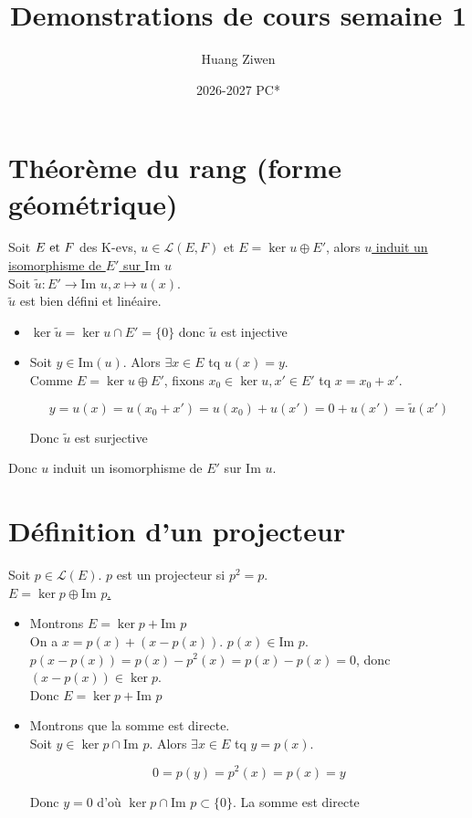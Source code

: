 \documentclass[]{article}
\title{Demonstrations de cours semaine 1}
\author{Huang Ziwen}
\date{2026-2027 PC*}
\begin{document}
\section{Théorème du rang (forme géométrique)}

Soit $E \text{ et } F$ des K-evs, $u \in \mathcal{L}(E, F)$ et $E = \ker u \oplus E'$, alors \underline{$u$ induit un isomorphisme de $E'$ sur $\text{Im } u$} \\

Soit $\tilde{u} : E' \rightarrow \text{Im } u, x \mapsto u(x)$. \\

$\tilde{u}$ est bien défini et linéaire. 

\begin{itemize}
    \item $\ker \tilde{u} = \ker u \cap E' = \{0\}$ donc $\tilde{u}$ est injective
    \item Soit $y \in \text{Im}(u)$. Alors $\exists x \in E$ tq $u(x) = y$. \\
    
    Comme $E = \ker u \oplus E'$, fixons $x_0 \in \ker u, x' \in E'$ tq $x = x_0 + x'$. 

    \[ y = u(x) = u(x_0 + x') = u(x_0) + u(x') = 0 + u(x') = \tilde{u}(x') \]

    Donc $\tilde{u}$ est surjective
\end{itemize}

Donc $u$ induit un isomorphisme de $E'$ sur $\text{Im } u$. 

\section{Définition d'un projecteur}

Soit $p \in \mathcal{L}(E)$. $p$ est un projecteur si \underline{$p^2 = p$}. \\

\underline{$E = \ker p \oplus \text{Im }p$.}

\begin{itemize}
    \item Montrons $E = \ker p + \text{Im }p$ \\
    
    On a $x = p(x) + (x - p(x))$. $p(x) \in \text{Im }p$. \\

    $p( x - p(x) ) = p(x) - p^2(x) = p(x) - p(x) = 0$, donc $(x-p(x)) \in \ker p$. \\

    Donc $E = \ker p + \text{Im }p$
    \item Montrons que la somme est directe. \\
    
    Soit $y \in \ker p \cap \text{Im }p$. Alors $\exists x \in E$ tq $y = p(x)$.

    \[ 0 = p(y) = p^2(x) = p(x) = y \]

    Donc $y = 0$ d'où $\ker p \cap \text{Im }p \subset \{0\}$. La somme est directe
\end{itemize}
\end{document}
